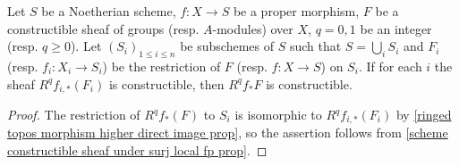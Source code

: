 \begin{lemma}\label{scheme etale sheaf proper finiteness theorem open cover reduction}
Let $S$ be a Noetherian scheme, $f:X\to S$ be a proper morphism, $F$ be a constructible sheaf of groups (resp. $A$-modules) over $X$, $q=0,1$ be an integer (resp. $q\geq 0$). Let $(S_i)_{1\leq i\leq n}$ be subschemes of $S$ such that $S=\bigcup_iS_i$ and $F_i$ (resp. $f_i:X_i\to S_i$) be the restriction of $F$ (resp. $f:X\to S$) on $S_i$. If for each $i$ the sheaf $R^qf_{i,*}(F_i)$ is constructible, then $R^qf_*F$ is constructible.
\end{lemma}
\begin{proof}
The restriction of $R^qf_*(F)$ to $S_i$ is isomorphic to $R^qf_{i,*}(F_i)$ by \cref{ringed topos morphism higher direct image prop}, so the assertion follows from \cref{scheme constructible sheaf under surj local fp prop}.
\end{proof}


